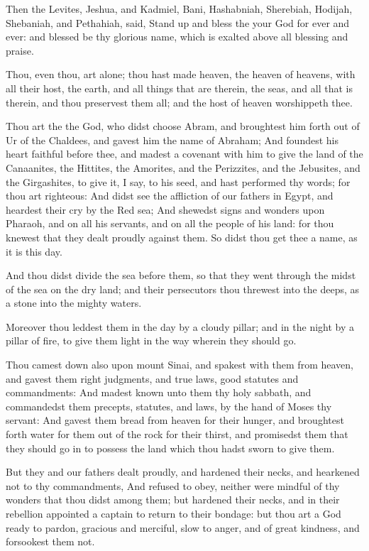 \Verse Then the Levites, Jeshua, and Kadmiel, Bani, Hashabniah, Sherebiah, Hodijah, Shebaniah, and Pethahiah, said, Stand up and bless the \LORD your God for ever and ever: and blessed be thy glorious name, which is exalted above all blessing and praise.

\Verse Thou, even thou, art \LORD alone; thou hast made heaven, the heaven of heavens, with all their host, the earth, and all things that are therein, the seas, and all that is therein, and thou preservest them all; and the host of heaven worshippeth thee.

\Verse Thou art the \LORD the God, who didst choose Abram, and broughtest him forth out of Ur of the Chaldees, and gavest him the name of Abraham; \Verse And foundest his heart faithful before thee, and madest a covenant with him to give the land of the Canaanites, the Hittites, the Amorites, and the Perizzites, and the Jebusites, and the Girgashites, to give it, I say, to his seed, and hast performed thy words; for thou art righteous: \Verse And didst see the affliction of our fathers in Egypt, and heardest their cry by the Red sea; \Verse And shewedst signs and wonders upon Pharaoh, and on all his servants, and on all the people of his land: for thou knewest that they dealt proudly against them. So didst thou get thee a name, as it is this day.

\Verse And thou didst divide the sea before them, so that they went through the midst of the sea on the dry land; and their persecutors thou threwest into the deeps, as a stone into the mighty waters.

\Verse Moreover thou leddest them in the day by a cloudy pillar; and in the night by a pillar of fire, to give them light in the way wherein they should go.

\Verse Thou camest down also upon mount Sinai, and spakest with them from heaven, and gavest them right judgments, and true laws, good statutes and commandments: \Verse And madest known unto them thy holy sabbath, and commandedst them precepts, statutes, and laws, by the hand of Moses thy servant: \Verse And gavest them bread from heaven for their hunger, and broughtest forth water for them out of the rock for their thirst, and promisedst them that they should go in to possess the land which thou hadst sworn to give them.

\Verse But they and our fathers dealt proudly, and hardened their necks, and hearkened not to thy commandments, \Verse And refused to obey, neither were mindful of thy wonders that thou didst among them; but hardened their necks, and in their rebellion appointed a captain to return to their bondage: but thou art a God ready to pardon, gracious and merciful, slow to anger, and of great kindness, and forsookest them not.

